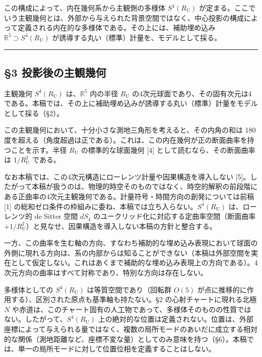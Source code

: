 \documentclass[
]{ltjsarticle}
\begin{document}
この構成によって、内在幾何系から主観側の多様体 \(S^4(R_{\mathrm U})\)
が定まる。ここでいう主観幾何とは、外部から与えられた背景空間ではなく、中心投影の構成によって定義される内在的な多様体である。その上には、補助埋め込み
\(\mathbb{R}^5\supset S^4(R_{\mathrm U})\)
が誘導する丸い（標準）計量を、モデルとして採る。

\begin{center}\rule{0.5\linewidth}{0.5pt}\end{center}

\subsection{§3
投影後の主観幾何}\label{ux6295ux5f71ux5f8cux306eux4e3bux89b3ux5e7eux4f55}

主観幾何 \(S^4(R_{\mathrm U})\) は、\(\mathbb{R}^5\) 内の半径
\(R_{\mathrm U}\)
の4次元球面であり、その固有次元は4である。本稿では、その上に補助埋め込みが誘導する丸い（標準）計量をモデルとして採る（§2）。

この主観幾何において、十分小さな測地三角形を考えると、その内角の和は 180
度を超える（角度超過は正である）。これは、この内在幾何が正の断面曲率を持つことを示す。半径
\(R_{\mathrm U}\) の標準的な球面幾何 {[}4{]}
として読むなら、その断面曲率は \(1/R_{\mathrm U}^2\) である。

なお本稿では、この4次元構造にローレンツ計量や因果構造を導入しない
{[}5{]}。したがって本稿が扱うのは、物理的時空そのものではなく、時空的解釈の前段階にある正曲率の4次元主観幾何である。計量符号・時間方向の創発については前稿
{[}1{]}
の総和ゼロ条件の枠組みに委ね、本稿では立ち入らない。\(S^4(R_{\mathrm U})\)
は、ローレンツ的 de Sitter 空間 \(dS_4\)
のユークリッド化に対応する定曲率空間（断面曲率
\(+1/R_{\mathrm U}^2\)）と見なせ、因果構造を導入しない本稿の方針と整合する。

一方、この曲率を生む軸の方向、すなわち補助的な埋め込み表現において球面の外側に現れる方向は、系の内部からは知ることができない（本稿は外部空間を実在として仮定しない。これはあくまで補助的な埋め込み表現上の方向である）。4次元方向の曲率はすべて対称であり、特別な方向は存在しない。

多様体としての \(S^4(R_{\mathrm U})\) は等質空間であり（回転群 \(O(5)\)
が点に推移的に作用する）、区別された原点も基準軸も持たない。§2
の心射チャートに現れる北極 \(N\)
や赤道は、このチャート固有の人工物であって、多様体そのものの性質ではない。したがって、\(S^4(R_{\mathrm U})\)
上の絶対的な位置は定義されない。位置は、外部座標によって与えられる量ではなく、複数の局所モードのあいだに成立する相対的な関係（測地距離など、座標不変な量）としてのみ意味を持つ（§6）。本稿では、単一の局所モードに対して位置位相を定義することはしない。
\end{document}
